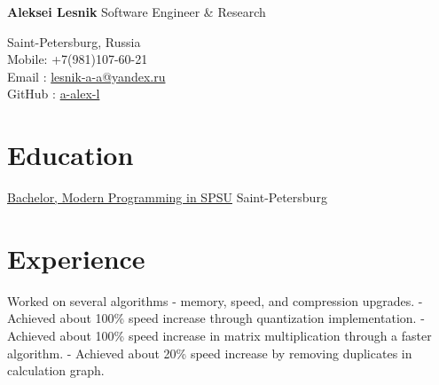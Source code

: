 \documentclass[12pt,a4paper]{moderncv}
\begin{document}

	\begin{minipage} {0.7\textwidth}
		\begin{flushleft}
			\huge \textbf{Aleksei Lesnik} 
			\newline
			\textcolor[gray]{0.4} {
			    \indent Software Engineer \& Research\\
			}
			\normalsize
		\end{flushleft}
	\end{minipage}
	\begin{minipage} {0.3\textwidth}
		\begin{flushright}
			\textcolor[gray]{0.4} {
				\indent Saint-Petersburg, Russia\\
				\indent Mobile: +7(981)107-60-21  \\
				\indent Email : \href{mailto:lesnik-a-a@yandex.ru} {lesnik-a-a@yandex.ru}\\ 
				\indent GitHub : \href{https://github.com/a-alex-l} {a-alex-l}\\  	
			}
		\end{flushright}
	\end{minipage}

    \section{Education}
    
            {\href {http://english.spbu.ru/education/undergraduate/bachelor/85-program-bac/2496-modern-programming}
                {Bachelor, Modern Programming in SPSU}}
            {}{}
            {Saint-Petersburg}
            {}

    \section{Experience}

            {Worked on several algorithms - memory, speed, and compression upgrades. \newline
             - Achieved about 100\% speed increase through quantization implementation. \newline
             - Achieved about 100\% speed increase in matrix multiplication through a faster algorithm. \newline
             - Achieved about 20\% speed increase by removing duplicates in calculation graph.}
             
\end{document}
